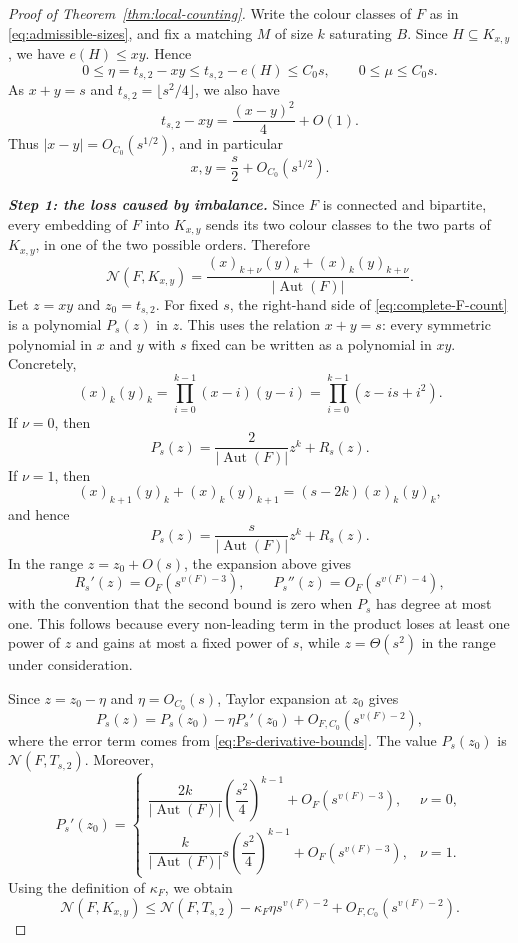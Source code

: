\documentclass[11pt]{article}
\theoremstyle{definition}
\theoremstyle{plain}
\theoremstyle{remark}
\theoremstyle{plain}
\numberwithin{equation}{section}
\DeclareMathOperator{\Aut}{Aut}
\newcommand{\N}{\mathcal N}
\begin{document}
\begin{proof}[Proof of Theorem~\ref{thm:local-counting}]
Write the colour classes of $F$ as in \eqref{eq:admissible-sizes}, and fix a matching $M$ of size $k$ saturating $B$. Since $H\subseteq K_{x,y}$, we have $e(H)\le xy$. Hence
\[
        0\le \eta=t_{s,2}-xy\le t_{s,2}-e(H)\le C_0s,
        \qquad
        0\le \mu\le C_0s.
\]
As $x+y=s$ and $t_{s,2}=\lfloor s^2/4\rfloor$, we also have
\[
        t_{s,2}-xy=\frac{(x-y)^2}{4}+O(1).
\]
Thus $|x-y|=O_{C_0}(s^{1/2})$, and in particular
\begin{equation}\label{eq:xy-near-balanced}
        x,y=\frac{s}{2}+O_{C_0}(s^{1/2}).
\end{equation}

\medskip
\noindent\emph{\textbf{Step 1: the loss caused by imbalance.}}
Since $F$ is connected and bipartite, every embedding of $F$ into $K_{x,y}$ sends its two colour classes to the two parts of $K_{x,y}$, in one of the two possible orders. Therefore
\begin{equation}
        \N(F,K_{x,y})=
        \frac{(x)_{k+\nu}(y)_k+(x)_k(y)_{k+\nu}}{|\Aut(F)|}.
        \label{eq:complete-F-count}
\end{equation}
Let $z=xy$ and $z_0=t_{s,2}$. For fixed $s$, the right-hand side of \eqref{eq:complete-F-count} is a polynomial $P_s(z)$ in $z$. This uses the relation $x+y=s$: every symmetric polynomial in $x$ and $y$ with $s$ fixed can be written as a polynomial in $xy$. Concretely,
\[
        (x)_k(y)_k=\prod_{i=0}^{k-1}(x-i)(y-i)
        =\prod_{i=0}^{k-1}(z-is+i^2).
\]
If $\nu=0$, then
\[
        P_s(z)=\frac{2}{|\Aut(F)|}z^k+R_s(z).
\]
If $\nu=1$, then
\[
        (x)_{k+1}(y)_k+(x)_k(y)_{k+1}
        =(s-2k)(x)_k(y)_k,
\]
and hence
\[
        P_s(z)=\frac{s}{|\Aut(F)|}z^k+R_s(z).
\]
In the range $z=z_0+O(s)$, the expansion above gives
\begin{equation}\label{eq:Ps-derivative-bounds}
        R_s'(z)=O_F(s^{v(F)-3}),\qquad
        P_s''(z)=O_F(s^{v(F)-4}),
\end{equation}
with the convention that the second bound is zero when $P_s$ has degree at most one. This follows because every non-leading term in the product loses at least one power of $z$ and gains at most a fixed power of $s$, while $z=\Theta(s^2)$ in the range under consideration.

Since $z=z_0-\eta$ and $\eta=O_{C_0}(s)$, Taylor expansion at $z_0$ gives
\[
        P_s(z)=P_s(z_0)-\eta P_s'(z_0)+O_{F,C_0}(s^{v(F)-2}),
\]
where the error term comes from \eqref{eq:Ps-derivative-bounds}. The value $P_s(z_0)$ is $\N(F,T_{s,2})$. Moreover,
\[
        P_s'(z_0)=
        \begin{cases}
        \dfrac{2k}{|\Aut(F)|}\left(\dfrac{s^2}{4}\right)^{k-1}+O_F(s^{v(F)-3}), & \nu=0,\\[1.4ex]
        \dfrac{k}{|\Aut(F)|}s\left(\dfrac{s^2}{4}\right)^{k-1}+O_F(s^{v(F)-3}), & \nu=1.
        \end{cases}
\]
Using the definition of $\kappa_F$, we obtain
\begin{equation}
        \N(F,K_{x,y})\le \N(F,T_{s,2})
        -\kappa_F\eta s^{v(F)-2}+O_{F,C_0}(s^{v(F)-2}).
        \label{eq:general-graph-loss}
\end{equation}


\end{proof}
\end{document}
